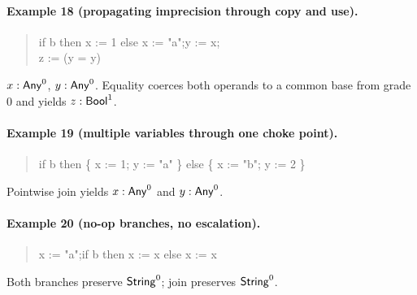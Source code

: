 \paragraph{Example 18 (propagating imprecision through copy and use).}
\begin{quote}\ttfamily
if b then x := 1 else x := "a";\quad y := x;\\
z := (y = y)
\end{quote}
$x:\mathsf{Any}^{0}$, $y:\mathsf{Any}^{0}$.  
Equality coerces both operands to a common base from grade $0$ and yields $z:\mathsf{Bool}^{1}$.

\paragraph{Example 19 (multiple variables through one choke point).}
\begin{quote}\ttfamily
if b then \{ x := 1; y := "a" \} else \{ x := "b"; y := 2 \}
\end{quote}
Pointwise join yields $x:\mathsf{Any}^{0}$ and $y:\mathsf{Any}^{0}$.

\paragraph{Example 20 (no-op branches, no escalation).}
\begin{quote}\ttfamily
x := "a";\quad if b then x := x else x := x
\end{quote}
Both branches preserve $\mathsf{String}^{0}$; join preserves $\mathsf{String}^{0}$.
